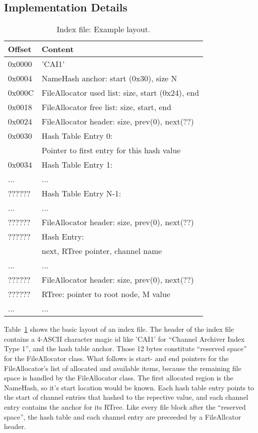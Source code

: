 \subsection{Implementation Details}

\begin{table}[htbp]
  \begin{center}
    \begin{tabular}{ll}
     Offset  & Content \\
     \hline
     0x0000  & 'CAI1' \\
     0x0004  & NameHash anchor: start (0x30), size N \\
     0x000C  & FileAllocator used list: size, start (0x24), end \\
     0x0018  & FileAllocator free list: size, start, end \\
     0x0024  & FileAllocator header: size, prev(0), next(??) \\
     0x0030  & Hash Table Entry 0: \\
             & Pointer to first entry for this hash value \\
     0x0034  & Hash Table Entry 1:  \\
     ...     & ... \\
     ??????  & Hash Table Entry N-1:  \\
     ...     & ... \\
     ??????  & FileAllocator header: size, prev(0), next(??) \\
     ??????  & Hash Entry: \\
             & next, RTree pointer, channel name \\
     ...     & ... \\  
     ??????  & FileAllocator header: size, prev(0), next(??) \\
     ??????  & RTree: pointer to root node, M value \\
     ...     & ... \\  
    \end{tabular}
    \caption{Index file: Example layout.}
    \label{tab:indexfile}
  \end{center}
\end{table}

\noindent Table~\ref{tab:indexfile} shows the basic layout of an index file.
The header of the index file contains a 4-ASCII character magic id
like 'CAI1' for ``Channel Archiver Index Type 1'',
and the hash table anchor.
Those 12 bytes constitute ``reserved space'' for the FileAllocator
class. What follows is start- and end pointers for the FileAllocator's
list of allocated and available items, because the remaining file space is
handled by the FileAllocator class.
The first allocated region is the NameHash, so it's start location
would be known. Each hash table entry points to the start of channel
entries that hashed to the repective value, and each channel entry
contains the anchor for its RTree. Like every file block after the
``reserved space'', the hash table and each channel entry are preceeded
by a FileAllcator header.

